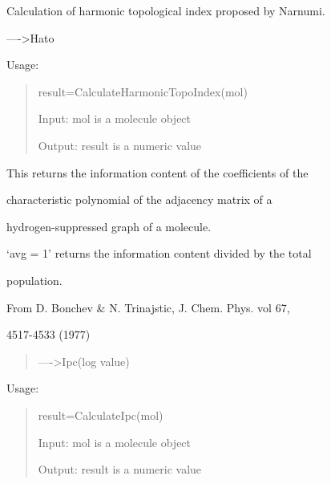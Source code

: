 \documentclass[letterpaper,10pt,english]{sphinxmanual}
\begin{document}

\begin{fulllineitems}
\label{reference/topology:topology.CalculateHarmonicTopoIndex}
Calculation of harmonic topological index proposed by Narnumi.

----\textgreater{}Hato

Usage:
\begin{quote}

result=CalculateHarmonicTopoIndex(mol)

Input: mol is a molecule object

Output: result is a numeric value
\end{quote}

\end{fulllineitems}


\begin{fulllineitems}
\label{reference/topology:topology.CalculateIpc}
This returns the information content of the coefficients of the

characteristic polynomial of the adjacency matrix of a

hydrogen-suppressed graph of a molecule.

`avg = 1' returns the information content divided by the total

population.

From D. Bonchev \& N. Trinajstic, J. Chem. Phys. vol 67,

4517-4533 (1977)
\begin{quote}

----\textgreater{}Ipc(log value)
\end{quote}

Usage:
\begin{quote}

result=CalculateIpc(mol)

Input: mol is a molecule object

Output: result is a numeric value
\end{quote}

\end{fulllineitems}

\end{document}
